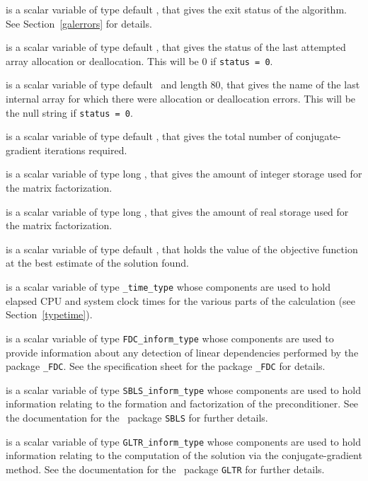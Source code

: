 \begin{description}

 is a scalar variable of type default \integer, that gives the
exit status of the algorithm. 
See Section~\ref{galerrors} 
for details.

 is a scalar variable of type default \integer, that gives
the status of the last attempted array allocation or deallocation.
This will be 0 if {\tt status = 0}.

 is a scalar variable of type default \character\
and length 80, that  gives the name of the last internal array 
for which there were allocation or deallocation errors.
This will be the null string if {\tt status = 0}. 

 is a scalar variable of type default \integer, that gives the
total number of conjugate-gradient iterations required.

 is a scalar variable of type long
\integer, that gives the amount of integer storage used for the matrix 
factorization.

 is a scalar variable of type long \integer, 
that gives the amount of real storage used for the matrix factorization.

 is a scalar variable of type default \realdp, that holds the
value of the objective function at the best estimate of the solution found.

 is a scalar variable of type {\tt \packagename\_time\_type} 
whose components are used to hold elapsed CPU and system clock times for the 
various parts of the calculation (see Section~\ref{typetime}).

 is a scalar variable of type {\tt FDC\_inform\_type}
whose components are used to provide information about any detection of linear 
dependencies performed by the package {\tt \libraryname\_FDC}. See the
specification sheet for the package {\tt \libraryname\_FDC} for details.

 is a scalar variable of type {\tt SBLS\_inform\_type} 
whose components are used to hold information relating to the 
formation and factorization of the preconditioner. See the
documentation for the \galahad\ package {\tt SBLS} for further details.

 is a scalar variable of type {\tt GLTR\_inform\_type} 
whose components are used to hold information relating to the 
computation of the solution via the conjugate-gradient method. See the
documentation for the \galahad\ package {\tt GLTR} for further details.

\end{description}
